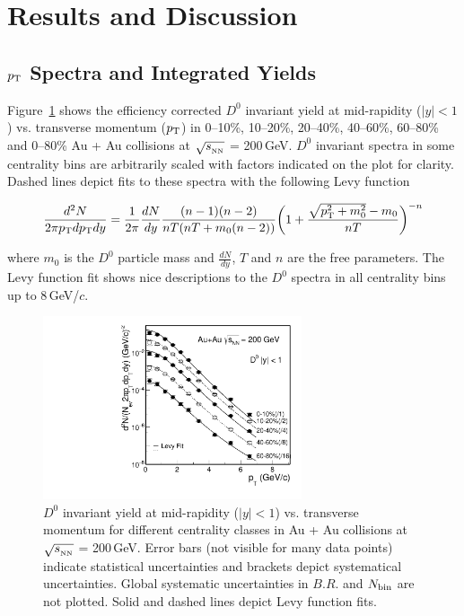 \clearpage

\section{\label{result}Results and Discussion}

\subsection{\label{result:pt}$p_{\rm T}$ Spectra and Integrated Yields}

Figure~\ref{figure:D0_spectra} shows the efficiency corrected $D^0$ invariant yield at mid-rapidity ($|y|<1$) vs. transverse momentum ($p_{\rm T}$) in 0--10\%, 10--20\%, 20--40\%, 40--60\%, 60--80\% and 0--80\% Au + Au collisions at $\sqrt{s_{_{\rm NN}}}$ = 200\,GeV. $D^0$ invariant spectra in some centrality bins are arbitrarily scaled with factors indicated on the plot for clarity. Dashed lines depict fits to these spectra with the following Levy function

\begin{equation}
\frac{d^2N}{2\pi p_{\rm T}dp_{\rm T}dy} = \frac{1}{2\pi}\frac{dN}{dy}\frac{(n-1)(n-2)}{nT(nT+m_0(n-2))}\bigg(1+\frac{\sqrt{p_{\rm T}^2+m_0^2}-m_0}{nT}\bigg)^{-n}
\end{equation}

where $m_0$ is the $D^0$ particle mass and $\frac{dN}{dy}$, $T$ and $n$ are the free parameters. The Levy function fit shows nice descriptions to the $D^0$ spectra in all centrality bins up to 8\,GeV/$c$.

\begin{figure}
\centering
\includegraphics[width=0.68\textwidth]{figure/Run14_D0HFT/D0_spectra.pdf}
\caption{$D^{0}$ invariant yield at mid-rapidity ($|y|<1$) vs. transverse momentum for different centrality classes in Au + Au collisions at $\sqrt{s_{_{\rm NN}}}$ = 200\,GeV. Error bars (not visible for many data points) indicate statistical uncertainties and brackets depict systematical uncertainties. Global systematic uncertainties in $B.R.$ and $N_{\rm bin}$ are not plotted. Solid and dashed lines depict Levy function fits.}
\label{figure:D0_spectra} 
\end{figure}

